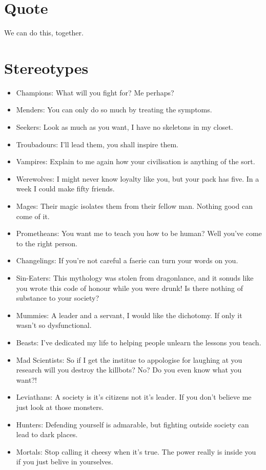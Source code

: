 \section*{Quote}

We can do this, together.
\section*{Stereotypes}
\begin{itemize}
\item Champions: What will you fight for? Me perhaps?
\item Menders: You can only do so much by treating the symptoms. 
\item Seekers: Look as much as you want, I have no skeletons in my closet. 
\item Troubadours: I'll lead them, you shall inspire them.

\item Vampires: Explain to me again how your civilisation is anything of the sort. 
\item Werewolves: I might never know loyalty like you, but your pack has five. In a week I could make fifty friends. 
\item Mages: Their magic isolates them from their fellow man. Nothing good can come of it. 
\item Prometheans: You want me to teach you how to be human? Well you've come to the right person. 
\item Changelings: If you're not careful a faerie can turn your words on you.
\item Sin-Eaters: This mythology was stolen from dragonlance, and it sonuds like you wrote this code of honour while you were drunk! Is there nothing of substance to your society?
\item Mummies: A leader and a servant, I would like the dichotomy. If only it wasn't so dysfunctional. 
\item Beasts: I've dedicated my life to helping people unlearn the lessons you teach. 
\item Mad Scientists: So if I get the institue to appologise for laughing at you research will you destroy the killbots? No? Do you even know what you want?!
\item Leviathans: A society is it's citizens not it's leader. If you don't believe me just look at those monsters.

\item Hunters: Defending yourself is admarable, but fighting outside society can lead to dark places.
\item Mortals: Stop calling it cheesy when it's true. The power really is inside you if you just belive in yourselves. 
\end{itemize}

